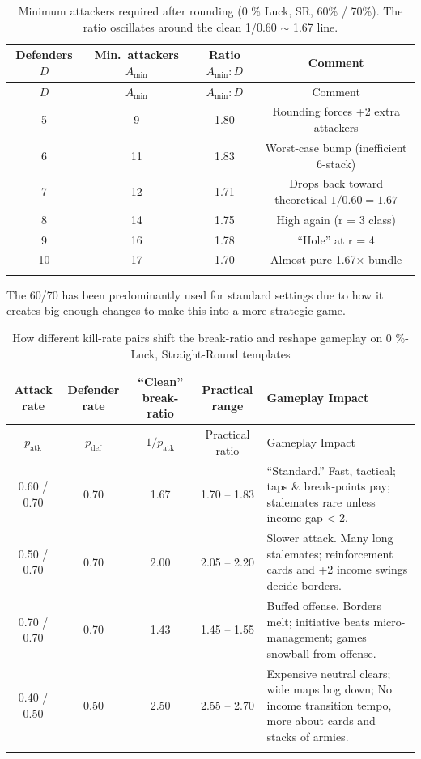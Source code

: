 \scriptsize
\begin{longtable}{|c|c|c|c|}
\hline
\rowcolor{Baby_Blue}
Defenders $D$ & Min.\ attackers $A_{\min}$ & Ratio $A_{\min}\! : D$ & Comment \\ \hline\hline
\endfirsthead
\hline
\rowcolor{Baby_Blue}
$D$ & $A_{\min}$ & $A_{\min}\! : D$ & Comment \\ \hline\hline
\endhead
5  & 9  & 1.80 & Rounding forces +2 extra attackers \\ \hline
6  & 11 & 1.83 & Worst-case bump (inefficient 6-stack) \\ \hline
7  & 12 & 1.71 & Drops back toward theoretical $1/0.60 = 1.67$ \\ \hline
8  & 14 & 1.75 & High again (r = 3 class) \\ \hline
9  & 16 & 1.78 & “Hole” at r = 4 \\ \hline
10 & 17 & 1.70 & Almost pure 1.67× bundle \\ \hline
\caption{Minimum attackers required after rounding (0 \% Luck, SR, 60\% / 70\%).  The ratio oscillates around the clean 1/0.60 $\sim$ 1.67 line.}
\label{table:rounding_bump}
\end{longtable}
\normalsize

The 60/70 has been predominantly used for standard settings due to how it creates big enough changes to make this into a more strategic game. 

\scriptsize
\begin{longtable}{|c|c|c|c|p{6.5cm}|}
\hline
\rowcolor{Baby_Blue}
Attack rate & Defender rate & “Clean” break-ratio & Practical range & Gameplay Impact \\ \hline\hline
\endfirsthead
\hline
\rowcolor{Baby_Blue}
$p_{\text{atk}}$ & $p_{\text{def}}$ & $1/p_{\text{atk}}$ & Practical ratio & Gameplay Impact \\ \hline\hline
\endhead
0.60 / 0.70 & 0.70 & 1.67 & 1.70 – 1.83 & “Standard.” Fast, tactical; taps \& break-points pay; stalemates rare unless income gap < 2. \\ \hline
0.50 / 0.70 & 0.70 & 2.00 & 2.05 – 2.20 & Slower attack. Many long stalemates; reinforcement cards and +2 income swings decide borders. \\ \hline
0.70 / 0.70 & 0.70 & 1.43 & 1.45 – 1.55 & Buffed offense. Borders melt; initiative beats micro-management; games snowball from offense. \\ \hline
0.40 / 0.50 & 0.50 & 2.50 & 2.55 – 2.70 & Expensive neutral clears; wide maps bog down; No income transition tempo, more about cards and stacks of armies. \\ \hline
\caption{How different kill-rate pairs shift the break-ratio and reshape gameplay on 0 \%-Luck, Straight-Round templates}
\label{table:killrate_variants}
\end{longtable}
\normalsize

